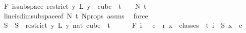 \begin{isabellebody}
\ F{}{\isacharcolon}{\kern0pt}\ {\isachardoublequoteopen}is{\isacharunderscore}{\kern0pt}subspace\ {\isacharparenleft}{\kern0pt}restrict\ {\isacharparenleft}{\kern0pt}{\isasymlambda}y{\isachardot}{\kern0pt}\ L{\isacharprime}{\kern0pt}\ {\isacharparenleft}{\kern0pt}y\ {}{\isacharparenright}{\kern0pt}{\isacharparenright}{\kern0pt}\ {\isacharparenleft}{\kern0pt}cube\ {}\ {\isacharparenleft}{\kern0pt}t\ {\isacharplus}{\kern0pt}\ {}{\isacharparenright}{\kern0pt}{\isacharparenright}{\kern0pt}{\isacharparenright}{\kern0pt}\ {}\ N{\isacharprime}{\kern0pt}\ {\isacharparenleft}{\kern0pt}t\ {\isacharplus}{\kern0pt}\ {}{\isacharparenright}{\kern0pt}{\isachardoublequoteclose}\ \isamarkupfalse%
\ line{\isacharunderscore}{\kern0pt}is{\isacharunderscore}{\kern0pt}dim{}{\isacharunderscore}{\kern0pt}subspace{\isacharbrackleft}{\kern0pt}of\ {\isachardoublequoteopen}N{\isacharprime}{\kern0pt}{\isachardoublequoteclose}\ {\isachardoublequoteopen}t{\isacharplus}{\kern0pt}{}{\isachardoublequoteclose}{\isacharbrackright}{\kern0pt}\ N{\isacharprime}{\kern0pt}{\isacharunderscore}{\kern0pt}props\ assms{\isacharparenleft}{\kern0pt}{}{\isacharparenright}{\kern0pt}\ \isamarkupfalse%
\ force\isanewline
\isanewline
\ \ \ \ \isamarkupfalse%
\ S{}\ \ {\isachardoublequoteopen}S{}\ {\isasymequiv}\ {\isacharparenleft}{\kern0pt}restrict\ {\isacharparenleft}{\kern0pt}{\isasymlambda}y{\isachardot}{\kern0pt}\ L{\isacharprime}{\kern0pt}\ {\isacharparenleft}{\kern0pt}y\ {\isacharparenleft}{\kern0pt}{}{\isacharcolon}{\kern0pt}{\isacharcolon}{\kern0pt}nat{\isacharparenright}{\kern0pt}{\isacharparenright}{\kern0pt}{\isacharparenright}{\kern0pt}\ {\isacharparenleft}{\kern0pt}cube\ {}\ {\isacharparenleft}{\kern0pt}t{\isacharplus}{\kern0pt}{}{\isacharparenright}{\kern0pt}{\isacharparenright}{\kern0pt}{\isacharparenright}{\kern0pt}{\isachardoublequoteclose}\isanewline
\ \ \ \ \isamarkupfalse%
\ F{}{\isacharcolon}{\kern0pt}\ {\isachardoublequoteopen}{\isacharparenleft}{\kern0pt}{\isasymforall}i\ {\isasymin}\ {\isacharbraceleft}{\kern0pt}{\isachardot}{\kern0pt}{\isachardot}{\kern0pt}{}{\isacharbraceright}{\kern0pt}{\isachardot}{\kern0pt}\ {\isasymexists}c\ {\isacharless}{\kern0pt}\ r{\isachardot}{\kern0pt}\ {\isacharparenleft}{\kern0pt}{\isasymforall}x\ {\isasymin}\ classes\ {}\ t\ i{\isachardot}{\kern0pt}\ {\isasymchi}\ {\isacharparenleft}{\kern0pt}S{}\ x{\isacharparenright}{\kern0pt}\ {\isacharequal}{\kern0pt}\ c{\isacharparenright}{\kern0pt}{\isacharparenright}{\kern0pt}{\isachardoublequoteclose}\isanewline

\end{isabellebody}
